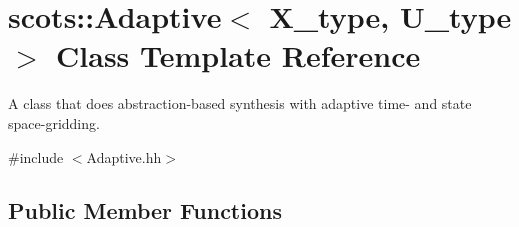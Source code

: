 \hypertarget{classscots_1_1Adaptive}{}\section{scots\+:\+:Adaptive$<$ X\+\_\+type, U\+\_\+type $>$ Class Template Reference}
\label{classscots_1_1Adaptive}


A class that does abstraction-\/based synthesis with adaptive time-\/ and state space-\/gridding.  




{\ttfamily \#include $<$Adaptive.\+hh$>$}

\subsection*{Public Member Functions}
